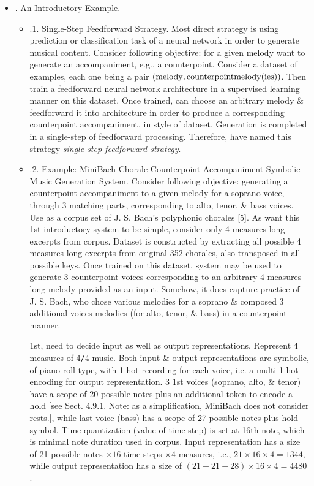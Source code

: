 \documentclass{article}
\begin{document}
\begin{itemize}
\begin{itemize}
		\item {. An Introductory Example.}
		\begin{itemize}
			\item {.1. Single-Step Feedforward Strategy.} Most direct strategy is using prediction or classification task of a neural network in order to generate musical content. Consider following objective: for a given melody want to generate an accompaniment, e.g., a counterpoint. Consider a dataset of examples, each one being a pair $({\rm melody},{\rm counterpointmelody}({\rm ies}))$. Then train a feedforward neural network architecture in a supervised learning manner on this dataset. Once trained, can choose an arbitrary melody \& feedforward it into architecture in order to produce a corresponding counterpoint accompaniment, in style of dataset. Generation is completed in a single-step of feedforward processing. Therefore, have named this strategy {\it single-step feedforward strategy}.
			\item {.2. Example: MiniBach Chorale Counterpoint Accompaniment Symbolic Music Generation System.} Consider following objective: generating a counterpoint accompaniment to a given melody for a soprano voice, through 3 matching parts, corresponding to alto, tenor, \& bass voices. Use as a corpus set of {\sc J. S. Bach}'s polyphonic chorales [5]. As want this 1st introductory system to be simple, consider only 4 measures long excerpts from corpus. Dataset is constructed by extracting all possible 4 measures long excerpts from original 352 chorales, also transposed in all possible keys. Once trained on this dataset, system may be used to generate 3 counterpoint voices corresponding to an arbitrary 4 measures long melody provided as an input. Somehow, it does capture practice of {\sc J. S. Bach}, who chose various melodies for a soprano \& composed 3 additional voices melodies (for alto, tenor, \& bass) in a counterpoint manner.

			1st, need to decide input as well as output representations. Represent 4 measures of 4{\tt/}4 music. Both input \& output representations are symbolic, of piano roll type, with 1-hot recording for each voice, i.e. a multi-1-hot encoding for output representation. 3 1st voices (soprano, alto, \& tenor) have a scope of 20 possible notes plus an additional token to encode a hold [see Sect. 4.9.1. Note: as a simplification, MiniBach does not consider rests.], while last voice (bass) has a scope of 27 possible notes plus hold symbol. Time quantization (value of time step) is set at 16th note, which is minimal note duration used in corpus. Input representation has a size of 21 possible notes $\times16$ time steps $\times4$ measures, i.e., $21\times16\times4 = 1344$, while output representation has a size of $(21 + 21 + 28)\times16\times4 = 4480$.


\end{itemize}
\end{itemize}
\end{itemize}
\end{document}
